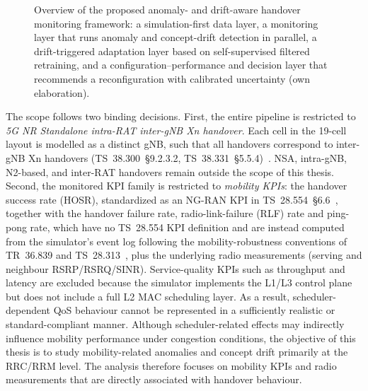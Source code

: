 \begin{figure}[p]
\centering
{}
\caption[Overview of the drift-aware handover monitoring framework]{Overview of
the proposed anomaly- and drift-aware handover monitoring framework: a
simulation-first data layer, a monitoring layer that runs anomaly and
concept-drift detection in parallel, a drift-triggered adaptation layer based on
self-supervised filtered retraining, and a configuration--performance and
decision layer that recommends a reconfiguration with calibrated uncertainty
(own elaboration).}
\label{fig:framework}
\end{figure}

The scope follows two binding decisions. First, the entire pipeline is restricted
to \emph{5G NR Standalone intra-RAT inter-gNB Xn handover}. Each cell in the
19-cell layout is modelled as a distinct gNB, such that all handovers
correspond to inter-gNB Xn handovers (TS~38.300~\S9.2.3.2,
TS~38.331~\S5.5.4)~\cite{ts38300,ts38331}. NSA, intra-gNB, N2-based, and
inter-RAT handovers remain outside the scope of this thesis. Second, the
monitored KPI family is restricted to \emph{mobility KPIs}: the handover success
rate (HOSR), standardized as an NG-RAN KPI in TS~28.554~\S6.6~\cite{ts28554},
together with the handover failure rate, radio-link-failure (RLF) rate and
ping-pong rate, which have no TS~28.554 KPI definition and are instead computed
from the simulator's event log following the mobility-robustness conventions of
TR~36.839 and TS~28.313~\cite{tr36839,ts28313}, plus
the underlying radio measurements (serving and neighbour RSRP/RSRQ/SINR).
Service-quality KPIs such as throughput and latency are excluded because the
simulator implements the L1/L3 control plane but does not include a full L2 MAC
scheduling layer. As a result, scheduler-dependent QoS behaviour cannot be
represented in a sufficiently realistic or standard-compliant manner. Although
scheduler-related effects may indirectly influence mobility performance under
congestion conditions, the objective of this thesis is to study mobility-related
anomalies and concept drift primarily at the RRC/RRM level. The analysis
therefore focuses on mobility KPIs and radio measurements that are directly
associated with handover behaviour.

